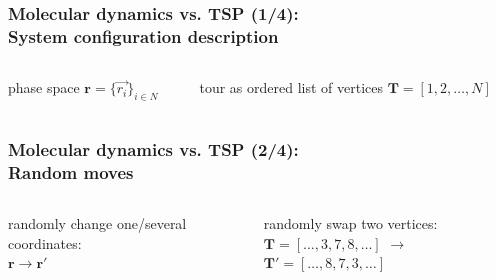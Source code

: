 \documentclass[aspectratio=43]{beamer}
\begin{document}
\begin{frame}
	\frametitle{Molecular dynamics vs. TSP (1/4):\\\alert{System configuration description}}
	\begin{columns}[T]
		\begin{column}{0.5\textwidth}
			\begin{description}
				 \item<1-> phase space $\boldsymbol{r}=\{\vec{r_i}\}_{i \in N}$
			 \end{description}		
		\end{column}
		\begin{column}{0.5\textwidth}
			\begin{description}
				 \item<1-> tour as ordered list of vertices $\boldsymbol{T}=[1, 2, \ldots, N]$
			 \end{description}				
		\end{column}
	\end{columns}
\end{frame}

\begin{frame}
	\frametitle{Molecular dynamics vs. TSP (2/4):\\\alert{Random moves}}
	\begin{columns}[T]
		\begin{column}{0.5\textwidth}
			\begin{description}
				 \item<1-> randomly change one/several coordinates:\\ $\boldsymbol{r} \rightarrow \boldsymbol{r}'$
			 \end{description}
		\end{column}	
		\begin{column}{0.5\textwidth}
			\begin{description}
				 \item<1-> randomly swap two vertices:\\ $\boldsymbol{T} = [\ldots, 3, 7, 8,\ldots]$ $\rightarrow$ $\boldsymbol{T}'=[\ldots, 8, 7, 3,\ldots]$
			 \end{description}
		\end{column}			
	\end{columns}
\end{frame}
\end{document}
